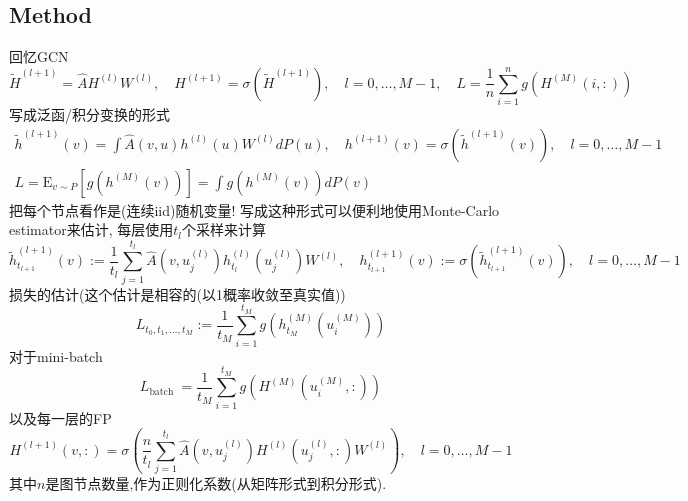 \documentclass{article}
\begin{document}
\subsection{Method}

    回忆GCN
    \begin{equation}
        \tilde{H}^{(l+1)}=\hat{A} H^{(l)} W^{(l)}, \quad H^{(l+1)}=\sigma\left(\tilde{H}^{(l+1)}\right), \quad l=0, \ldots, M-1, \quad L=\frac{1}{n} \sum_{i=1}^{n} g\left(H^{(M)}(i,:)\right)
    \end{equation}
    写成泛函/积分变换的形式
    \begin{equation}
        \begin{array}{c}
        \tilde{h}^{(l+1)}(v)=\int \hat{A}(v, u) h^{(l)}(u) W^{(l)} d P(u), \quad h^{(l+1)}(v)=\sigma\left(\tilde{h}^{(l+1)}(v)\right), \quad l=0, \ldots, M-1 \\
        L=\mathrm{E}_{v \sim P}\left[g\left(h^{(M)}(v)\right)\right]=\int g\left(h^{(M)}(v)\right) d P(v)
        \end{array}
    \end{equation}
    把每个节点看作是(连续iid)随机变量!
    写成这种形式可以便利地使用Monte-Carlo estimator来估计, 每层使用$t_l$个采样来计算
    \begin{equation}
        \tilde{h}_{t_{l+1}}^{(l+1)}(v):=\frac{1}{t_{l}} \sum_{j=1}^{t_{l}} \hat{A}\left(v, u_{j}^{(l)}\right) h_{t_{l}}^{(l)}\left(u_{j}^{(l)}\right) W^{(l)}, \quad h_{t_{l+1}}^{(l+1)}(v):=\sigma\left(\tilde{h}_{t_{l+1}}^{(l+1)}(v)\right), \quad l=0, \ldots, M-1
    \end{equation}
    损失的估计(这个估计是相容的(以1概率收敛至真实值))
    \begin{equation}
        L_{t_{0}, t_{1}, \ldots, t_{M}}:=\frac{1}{t_{M}} \sum_{i=1}^{t_{M}} g\left(h_{t_{M}}^{(M)}\left(u_{i}^{(M)}\right)\right)
    \end{equation}
    对于mini-batch
    \begin{equation}
        L_{\text {batch }}=\frac{1}{t_{M}} \sum_{i=1}^{t_{M}} g\left(H^{(M)}\left(u_{i}^{(M)},:\right)\right)
    \end{equation}
    以及每一层的FP
    \begin{equation}
        H^{(l+1)}(v,:)=\sigma\left(\frac{n}{t_{l}} \sum_{j=1}^{t_{l}} \hat{A}\left(v, u_{j}^{(l)}\right) H^{(l)}\left(u_{j}^{(l)},:\right) W^{(l)}\right), \quad l=0, \ldots, M-1
    \end{equation}
    其中$n$是图节点数量,作为正则化系数(从矩阵形式到积分形式).
\end{document}
